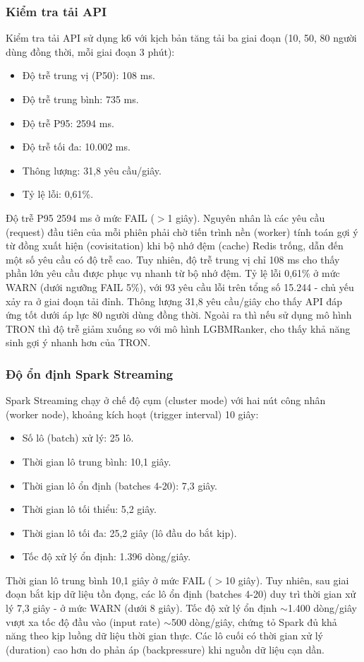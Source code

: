 \documentclass[../BTL.tex]{subfiles}
\begin{document}
\subsubsection{Kiểm tra tải API}
Kiểm tra tải API sử dụng k6 với kịch bản tăng tải ba giai đoạn (10, 50, 80 người dùng đồng thời, mỗi giai đoạn 3 phút):
\begin{itemize}
    \item Độ trễ trung vị (P50): 108 ms.
    \item Độ trễ trung bình: 735 ms.
    \item Độ trễ P95: 2594 ms.
    \item Độ trễ tối đa: 10.002 ms.
    \item Thông lượng: 31,8 yêu cầu/giây.
    \item Tỷ lệ lỗi: 0,61\%.
\end{itemize}
Độ trễ P95 2594 ms ở mức FAIL ($>$1 giây). Nguyên nhân là các yêu cầu (request) đầu tiên của mỗi phiên phải chờ tiến trình nền (worker) tính toán gợi ý từ đồng xuất hiện (covisitation) khi bộ nhớ đệm (cache) Redis trống, dẫn đến một số yêu cầu có độ trễ cao. Tuy nhiên, độ trễ trung vị chỉ 108 ms cho thấy phần lớn yêu cầu được phục vụ nhanh từ bộ nhớ đệm. Tỷ lệ lỗi 0,61\% ở mức WARN (dưới ngưỡng FAIL 5\%), với 93 yêu cầu lỗi trên tổng số 15.244 - chủ yếu xảy ra ở giai đoạn tải đỉnh. Thông lượng 31,8 yêu cầu/giây cho thấy API đáp ứng tốt dưới áp lực 80 người dùng đồng thời. Ngoài ra thì nếu sử dụng mô hình TRON thì độ trễ  giảm xuống so với mô hình LGBMRanker, cho thấy khả năng sinh gợi ý nhanh hơn của TRON.

\subsubsection{Độ ổn định Spark Streaming}
Spark Streaming chạy ở chế độ cụm (cluster mode) với hai nút công nhân (worker node), khoảng kích hoạt (trigger interval) 10 giây:
\begin{itemize}
    \item Số lô (batch) xử lý: 25 lô.
    \item Thời gian lô trung bình: 10,1 giây.
    \item Thời gian lô ổn định (batches 4-20): 7,3 giây.
    \item Thời gian lô tối thiểu: 5,2 giây.
    \item Thời gian lô tối đa: 25,2 giây (lô đầu do bắt kịp).
    \item Tốc độ xử lý ổn định: 1.396 dòng/giây.
\end{itemize}
Thời gian lô trung bình 10,1 giây ở mức FAIL ($>$10 giây). Tuy nhiên, sau giai đoạn bắt kịp dữ liệu tồn đọng, các lô ổn định (batches 4-20) duy trì thời gian xử lý 7,3 giây - ở mức WARN (dưới 8 giây). Tốc độ xử lý ổn định $\sim$1.400 dòng/giây vượt xa tốc độ đầu vào (input rate) $\sim$500 dòng/giây, chứng tỏ Spark đủ khả năng theo kịp luồng dữ liệu thời gian thực. Các lô cuối có thời gian xử lý (duration) cao hơn do phản áp (backpressure) khi nguồn dữ liệu cạn dần.
\end{document}
